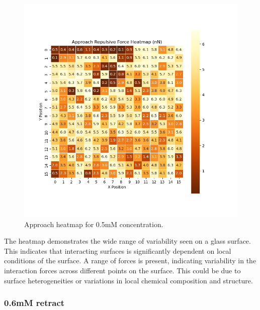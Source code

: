 
\begin{figure}[h]
    \centering
    \includegraphics[width=\textwidth]{chapter7/ForceMaps/0.5mM/Approach heatmap.png}
    \caption{Approach heatmap for 0.5mM concentration.}
    \label{fig:approach_heatmap_0.5mM}
\end{figure}

The heatmap demonstrates the wide range of variability seen on a glass surface. This indicates that interacting surfaces is significantly dependent on local conditions of the surface. A range of forces is present, indicating variability in the interaction forces across different points on the surface. This could be due to surface heterogeneities or variations in local chemical composition and structure. 
\newpage

\subsubsection{0.6mM retract}

